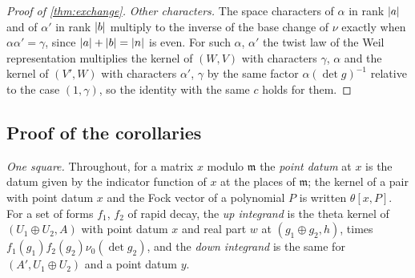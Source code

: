 \begin{proof}[Proof of \cref{thm:exchange}]
\emph{Other characters.} The space characters of $\alpha$ in rank $\lvert a\rvert$ and of $\alpha'$ in rank $\lvert b\rvert$ multiply to the inverse of the base change of $\nu$ exactly when $\alpha\alpha'=\gamma$, since
$\lvert a\rvert+\lvert b\rvert=\lvert n\rvert$ is even. For such $\alpha$, $\alpha'$ the twist law of the Weil representation multiplies the kernel of $(W,V)$ with characters $\gamma$, $\alpha$ and the kernel of $(V',W)$ with characters
$\alpha'$, $\gamma$ by the same factor $\alpha(\det g)^{-1}$ relative to the case $(1,\gamma)$, so the identity with the same $c$ holds for them.
\end{proof}

\subsection{Proof of the corollaries}\label{ss:exchange-corollaries}
\emph{One square.} Throughout, for a matrix $x$ modulo $\mathfrak m$ the \emph{point datum} at $x$ is the datum given by the indicator function of $x$ at the places of $\mathfrak m$; the kernel of a pair with point datum
$x$ and the Fock vector of a polynomial $P$ is written $\theta[x,P]$. For a set of forms $f_1$, $f_2$ of rapid decay, the \emph{up integrand} is the theta kernel of $(U_1\oplus U_2,A)$ with point datum $x$ and real
part $w$ at $(g_1\oplus g_2,h)$, times $f_1(g_1)f_2(g_2)\nu_0(\det g_2)$, and the \emph{down integrand} is the same for $(A',U_1\oplus U_2)$ and a point datum $y$.

